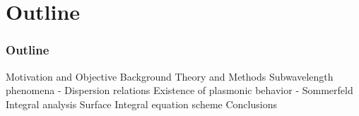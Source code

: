 \documentclass[mathserif,16pt,xcolor=table]{beamer}
\begin{document}
\section{Outline}
\begin{frame}
  \frametitle{Outline}
  \begin{outline}[itemize]
    \1 Motivation and Objective
    \1 Background
    \1 Theory and Methods
      \2 Subwavelength phenomena - Dispersion relations
      \2 Existence of plasmonic behavior - Sommerfeld Integral analysis
      \2 Surface Integral equation scheme
    \1 Conclusions
  \end{outline}
\end{frame}
\end{document}
